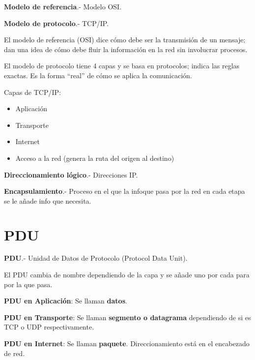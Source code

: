 \documentclass{article}
\begin{document}
\textbf{Modelo de referencia}.- Modelo OSI.
\vspace{1em}

\textbf{Modelo de protocolo}.- TCP/IP.
\vspace{1em}

El modelo de referencia (OSI) dice cómo debe ser la transmisión de un mensaje;
dan una idea de cómo debe fluir la información en la red sin involucrar procesos.
\vspace{1em}

El modelo de protocolo tiene 4 capas y se basa en protocolos; indica las reglas
exactas. Es la forma ``real'' de cómo se aplica la comunicación.
\vspace{1em}

Capas de TCP/IP:

\begin{itemize}
	\item
	Aplicación
	\item
	Transporte
	\item
	Internet
	\item
	Acceso a la red (genera la ruta del origen al destino)
\end{itemize}
\vspace{1em}

\textbf{Direccionamiento lógico}.- Direcciones IP.
\vspace{1em}

\textbf{Encapsulamiento}.- Proceso en el que la infoque pasa por la red en cada
etapa se le añade info que necesita.
\vspace{1em}

\section{PDU}

\textbf{PDU}.- Unidad de Datos de Protocolo (Protocol Data Unit).
\vspace{1em}

El PDU cambia de nombre dependiendo de la capa y se añade uno por cada para por
la que pasa.
\vspace{1em}

\textbf{PDU en Aplicación}: Se llaman \textbf{datos}.
\vspace{1em}

\textbf{PDU en Transporte}: Se llaman \textbf{segmento o datagrama } dependiendo de si es
TCP o UDP respectivamente.
\vspace{1em}

\textbf{PDU en Internet}: Se llaman \textbf{paquete}. Direccionamiento está en
el encabezado de red.
\vspace{1em}
\end{document}
